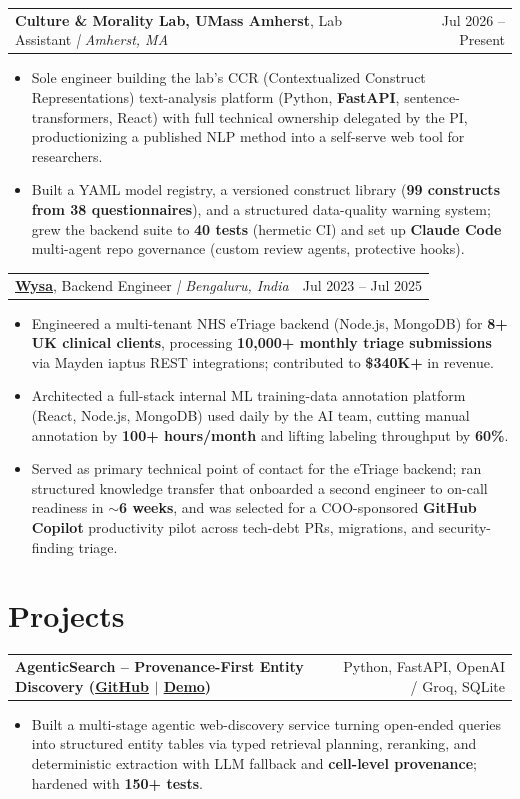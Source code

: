 \documentclass[letterpaper,11pt]{article}
\makeatletter
\newcommand{\expItem}[4]{%
  \vspace{2pt}
  \begin{tabular*}{\textwidth}{@{}l@{\extracolsep{\fill}}r@{}}
    \textbf{#1}, #2 \textit{| #3} & #4 \\
  \end{tabular*}\par\vspace{-3pt}
}
\newcommand{\projItem}[2]{%
  \vspace{2pt}
  \begin{tabular*}{\textwidth}{@{}l@{\extracolsep{\fill}}r@{}}
    \textbf{#1} & #2 \\
  \end{tabular*}\par\vspace{-3pt}
}
\makeatother
\begin{document}
\expItem{Culture \& Morality Lab, UMass Amherst}{Lab Assistant}{Amherst, MA}{Jul 2026 -- Present}
\begin{itemize}
  \item Sole engineer building the lab's CCR (Contextualized Construct Representations) text-analysis platform (Python, \textbf{FastAPI}, sentence-transformers, React) with full technical ownership delegated by the PI, productionizing a published NLP method into a self-serve web tool for researchers.
  \item Built a YAML model registry, a versioned construct library (\textbf{99 constructs from 38 questionnaires}), and a structured data-quality warning system; grew the backend suite to \textbf{40 tests} (hermetic CI) and set up \textbf{Claude Code} multi-agent repo governance (custom review agents, protective hooks).
\end{itemize}

\expItem{\href{https://www.wysa.io}{Wysa}}{Backend Engineer}{Bengaluru, India}{Jul 2023 -- Jul 2025}
\begin{itemize}
  \item Engineered a multi-tenant NHS eTriage backend (Node.js, MongoDB) for \textbf{8+ UK clinical clients}, processing \textbf{10{,}000+ monthly triage submissions} via Mayden iaptus REST integrations; contributed to \textbf{\$340K+} in revenue.
  \item Architected a full-stack internal ML training-data annotation platform (React, Node.js, MongoDB) used daily by the AI team, cutting manual annotation by \textbf{100+ hours/month} and lifting labeling throughput by \textbf{60\%}.
  \item Served as primary technical point of contact for the eTriage backend; ran structured knowledge transfer that onboarded a second engineer to on-call readiness in \textbf{$\sim$6 weeks}, and was selected for a COO-sponsored \textbf{GitHub Copilot} productivity pilot across tech-debt PRs, migrations, and security-finding triage.
\end{itemize}

\section{Projects}

\projItem{AgenticSearch -- Provenance-First Entity Discovery {\normalfont\small(\href{https://github.com/Deva-1903/ciir_agentic_search}{GitHub} $\vert$ \href{https://agentic-search-negglszkwa-uc.a.run.app}{Demo})}}{Python, FastAPI, OpenAI / Groq, SQLite}
\begin{itemize}
  \item Built a multi-stage agentic web-discovery service turning open-ended queries into structured entity tables via typed retrieval planning, reranking, and deterministic extraction with LLM fallback and \textbf{cell-level provenance}; hardened with \textbf{150+ tests}.
\end{itemize}
\end{document}
